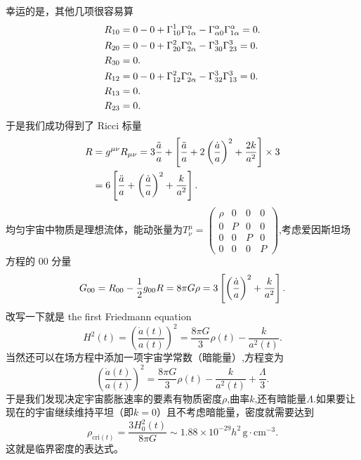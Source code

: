 \documentclass[../天体物理基础.tex]{subfiles}
\begin{document}
幸运的是，其他几项很容易算
\begin{align}
R_{10}&=0-0+\Gamma_{10}^{1}\Gamma_{1\alpha}^{\alpha}-\Gamma_{\alpha0}^{\alpha}\Gamma_{1\alpha}^{\alpha}=0.\notag\\
R_{20}&=0-0+\Gamma_{20}^{2}\Gamma_{2\alpha}^{\alpha}-\Gamma_{30}^{3}\Gamma_{23}^{3}=0.\notag\\
R_{30}&=0.\notag\\
R_{12}&=0-0+\Gamma_{12}^{2}\Gamma_{2\alpha}^{\alpha}-\Gamma_{32}^{3}\Gamma_{13}^{3}=0.\notag\\
R_{13}&=0.\notag\\
R_{23}&=0.\notag
\end{align}
于是我们成功得到了 Ricci 标量
\begin{align}
R&=g^{\mu\nu}R_{\mu\nu}=3\frac{\ddot a}{a}+\left[\frac{\ddot a}{a}+2\left(\frac{\dot a}{a}\right)^{2}+\frac{2k}{a^{2}}\right]\times3\notag\\
&=6\left[\frac{\ddot a}{a}+\left(\frac{\dot a}{a}\right)^{2}+\frac{k}{a^{2}}\right].\notag
\end{align}
均匀宇宙中物质是理想流体，能动张量为$T^{\mu}_{\nu}=\begin{pmatrix}
\rho & 0 & 0 & 0\\
0 & P & 0 & 0\\
0 & 0 & P & 0\\
0 & 0 & 0 & P
\end{pmatrix}$,考虑爱因斯坦场方程的 00 分量
\begin{equation}
G_{00}=R_{00}-\frac{1}{2}g_{00}R=8\pi G\rho=3\left[\left(\frac{\dot a}{a}\right)^{2}+\frac{k}{a^{2}}\right].\notag
\end{equation}
改写一下就是 the first Friedmann equation
\begin{equation}
H^{2}\left(t\right)=\left(\frac{\dot{a}\left(t\right)}{a\left(t\right)}\right)^{2}=\frac{8\pi G}{3}\rho\left(t\right)-\frac{k}{a^{2}\left(t\right)}.
\end{equation}
当然还可以在场方程中添加一项宇宙学常数（暗能量）,方程变为
\begin{equation}
\left(\frac{\dot{a}\left(t\right)}{a\left(t\right)}\right)^{2}=\frac{8\pi G}{3}\rho\left(t\right)-\frac{k}{a^{2}\left(t\right)}+\frac{\Lambda}{3}.\label{1.6.8}
\end{equation}
于是我们发现决定宇宙膨胀速率的要素有物质密度$\rho$,曲率$k$,还有暗能量$\Lambda$.如果要让现在的宇宙继续维持平坦（即$k=0$）且不考虑暗能量，密度就需要达到
\begin{equation}
\rho_{\text{cri}\left(t\right)}=\frac{3H_{0}^{2}\left(t\right)}{8\pi G}\sim1.88\times10^{-29}h^{2}\,\mathrm{g\cdot{}cm^{-3}}.
\end{equation}
这就是临界密度的表达式。
\end{document}
